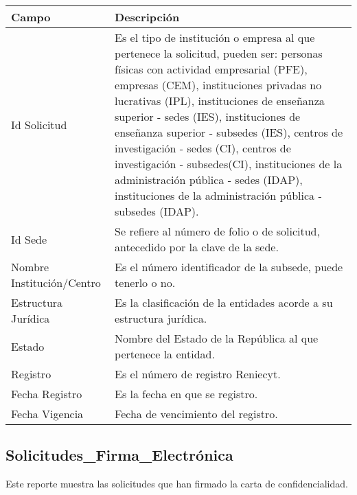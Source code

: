 \begin{tabular}{ m{} m{}  }%
	\rowcolor{gray1} {\bf Campo} &  {\bf Descripción} \\ \hline \hline

	Id Solicitud & Es el tipo de institución o empresa al que pertenece la solicitud, pueden ser: personas físicas con actividad empresarial (PFE), empresas (CEM), instituciones privadas no lucrativas (IPL), instituciones de enseñanza superior - sedes (IES), instituciones de enseñanza superior - subsedes (IES), centros de investigación - sedes (CI), centros de investigación - subsedes(CI), instituciones de la administración pública - sedes (IDAP), instituciones de la administración pública - subsedes (IDAP).\\
	\rowcolor{gray1}Id Sede & Se refiere al número de folio o de solicitud, antecedido por la clave de la sede.\\
	Nombre Institución/Centro & Es el número identificador de la subsede, puede tenerlo o no.\\
	\rowcolor{gray1}Estructura Jurídica & Es la clasificación de la entidades acorde a su estructura jurídica.\\
	Estado & Nombre del Estado de la República al que pertenece la entidad.\\
	\rowcolor{gray1}Registro & Es el número de registro Reniecyt.\\
	Fecha Registro & Es la fecha en que se registro.\\
	\rowcolor{gray1}Fecha Vigencia & Fecha de vencimiento del registro.\\
\end{tabular}

\newpage
\subsection{Solicitudes\_Firma\_Electrónica}
\label{appendix:Reportes:PeopleSoft:SolicitudesFirmaElectronicaGenerada}
Este reporte muestra las solicitudes que han firmado la carta de confidencialidad.\\

